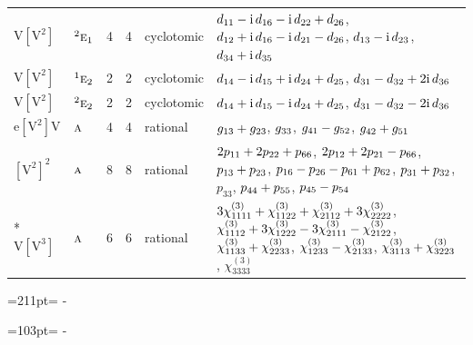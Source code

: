 \documentclass[10pt,a4paper]{article}
\newcommand{\needspace}[1]{\par\penalty-100\begingroup\dimen0=#1\relax\dimen2=\pagegoal
  \advance\dimen2-\pagetotal\ifdim\dimen0>\dimen2\relax\ifdim\dimen2>0pt\vfil\break\fi\fi
  \endgroup}
\numberwithin{equation}{section}
\newcommand{\irr}[1]{\text{\normalfont\scshape #1}}
\newcommand{\conjpair}[1]{{}^{#1}}
\newcommand{\iunit}{\mathrm{i}}
\newcommand{\jahn}[1]{\mathrm{#1}}
\newlength{\fillwidth}\newlength{\cellwidth}\newlength{\colwidth}
\newcommand{\signbreak}{\penalty100\relax}
\begin{document}
{\begin{longtable}{@{}llrrl>{\RaggedRight\arraybackslash}p{\fillwidth}@{}}
$\jahn{V[V^{2}]}$ & $\conjpair{2}\irr{e}_{1}$ & 4 & 4 & cyclotomic & $d_{11} -\signbreak \iunit{}\,d_{16} -\signbreak \iunit{}\,d_{22} +\signbreak d_{26}$, $d_{12} +\signbreak \iunit{}\,d_{16} -\signbreak \iunit{}\,d_{21} -\signbreak d_{26}$, $d_{13} -\signbreak \iunit{}\,d_{23}$, $d_{34} +\signbreak \iunit{}\,d_{35}$\\
$\jahn{V[V^{2}]}$ & $\conjpair{1}\irr{e}_{2}$ & 2 & 2 & cyclotomic & $d_{14} -\signbreak \iunit{}\,d_{15} +\signbreak \iunit{}\,d_{24} +\signbreak d_{25}$, $d_{31} -\signbreak d_{32} +\signbreak 2\iunit{}\,d_{36}$\\
$\jahn{V[V^{2}]}$ & $\conjpair{2}\irr{e}_{2}$ & 2 & 2 & cyclotomic & $d_{14} +\signbreak \iunit{}\,d_{15} -\signbreak \iunit{}\,d_{24} +\signbreak d_{25}$, $d_{31} -\signbreak d_{32} -\signbreak 2\iunit{}\,d_{36}$\\
$\jahn{e[V^{2}]V}$ & $\irr{a}$ & 4 & 4 & rational & $\mathnormal{g}_{13} +\signbreak \mathnormal{g}_{23}$, $\mathnormal{g}_{33}$, $\mathnormal{g}_{41} -\signbreak \mathnormal{g}_{52}$, $\mathnormal{g}_{42} +\signbreak \mathnormal{g}_{51}$\\
$\jahn{[V^{2}]^{2}}$ & $\irr{a}$ & 8 & 8 & rational & $2p_{11} +\signbreak 2p_{22} +\signbreak p_{66}$, $2p_{12} +\signbreak 2p_{21} -\signbreak p_{66}$, $p_{13} +\signbreak p_{23}$, $p_{16} -\signbreak p_{26} -\signbreak p_{61} +\signbreak p_{62}$, $p_{31} +\signbreak p_{32}$, $p_{33}$, $p_{44} +\signbreak p_{55}$, $p_{45} -\signbreak p_{54}$\\*
$\jahn{V[V^{3}]}$ & $\irr{a}$ & 6 & 6 & rational & $3\chi^{(3)}_{1111} +\signbreak \chi^{(3)}_{1122} +\signbreak \chi^{(3)}_{2112} +\signbreak 3\chi^{(3)}_{2222}$, $\chi^{(3)}_{1112} +\signbreak 3\chi^{(3)}_{1222} -\signbreak 3\chi^{(3)}_{2111} -\signbreak \chi^{(3)}_{2122}$, $\chi^{(3)}_{1133} +\signbreak \chi^{(3)}_{2233}$, $\chi^{(3)}_{1233} -\signbreak \chi^{(3)}_{2133}$, $\chi^{(3)}_{3113} +\signbreak \chi^{(3)}_{3223}$, $\chi^{(3)}_{3333}$\\
\bottomrule\end{longtable}}
\needspace{211pt}
\needspace{103pt}
\end{document}
